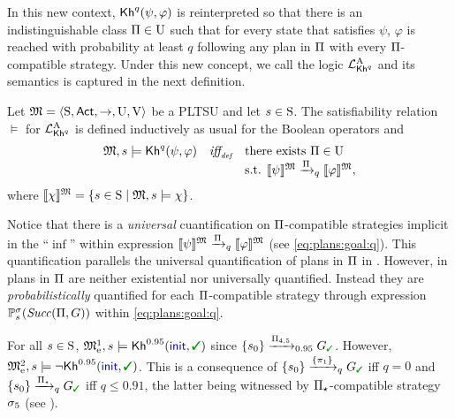 In this new context, $\kh^q(\psi,\varphi)$ is reinterpreted so that
there is an indistinguishable class $\plans\in\Unc$ such that for
every state that satisfies $\psi$, $\varphi$ is reached with
probability at least $q$ following any plan in $\plans$ with every
$\plans$-compatible strategy.
%
Under this new concept, we call the logic $\PKhadapt$ and its
semantics is captured in the next definition.

\begin{definition}\label{def:semantics:PKhadapt}
  Let $\model = \tup{\S,\Act,\ra,\Unc,\V}$ be a PLTSU and let $s\in\S$.  The
  satisfiability relation $\models$ for $\PKhadapt$ is defined inductively 
  as usual for the Boolean operators and
  \[
  \begin{array}{l@{\ \ \ }c@{\ \ \  }l}
    \model, s \models \kh^q(\psi,\varphi) & \iffdef &  \text{there exists } {\plans \in \Unc}  \\
    & & \text{s.t. } {\truthset{\model}{\psi} \reach{\plans}_q \truthset{\model}{\varphi}}, 
  \end{array}
  \]    
  where $\truthset{\model}{\chi} = \csetsc{s\in\S}{\model,s\models\chi}$.
\end{definition}

Notice that there is a \emph{universal} cuantification on
$\plans$-compatible strategies implicit in the ``$\inf$'' within
expression
$\truthset{\model}{\psi}\reach{\plans}_q\truthset{\model}{\varphi}$
(see \cref{eq:plans:goal:q}).
%
This quantification parallels the universal quantification of plans in
$\plans$ in .
%
However, in  plans in $\plans$ are
neither existential nor universally quantified.  Instead they are
\emph{probabilistically} quantified for each $\plans$-compatible
strategy through expression $\Prob^\strat_s(\Succ(\plans,G))$ within
\cref{eq:plans:goal:q}.

\begin{example}\label{ex:running:pkhadapt}
  For all $s\in\S$, $\modelex^1,s \models \kh^{0.95}(\init,\goal)$ since 
  $\{s_0\}\reach{\plans_{4,5}}_{0.95}G_{\goal}$.
  However, $\modelex^2,s \models \neg\kh^{0.95}(\init,\goal)$.  This
  is a consequence of $\{s_0\}\reach{\{\plan_1\}}_qG_{\goal}$ iff
  $q=0$ and $\{s_0\}\reach{\plans_{\star}}_qG_{\goal}$ iff $q\leq
  0.91$, the latter being witnessed by $\plans_{\star}$-compatible
  strategy $\strat_5$ (see ).
\end{example}


